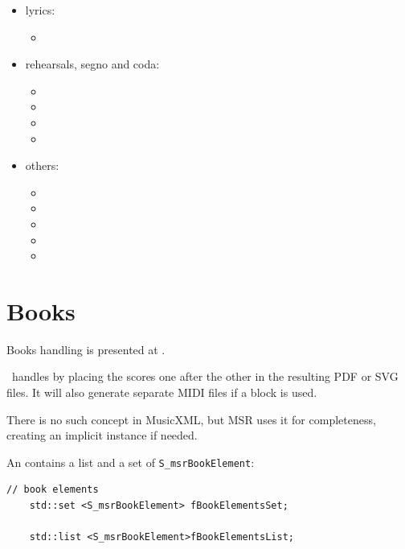 \begin{itemize}
\item lyrics:

\begin{itemize}
	\item {}
  \end{itemize}

\item rehearsals, segno and coda:

\begin{itemize}
  \item {}
	\item {}
  \item {}
  \item {}
 \end{itemize}

\item others:

\begin{itemize}
  \item {}
  \item {}
  \item {}
  \item {}
  \item {}
  \end{itemize}

\end{itemize}


\section{Books}\label{Books}

Books handling is presented at .

\lily\ handles  by placing the scores one after the other in the resulting PDF or SVG files. It will also generate separate MIDI files if a  block is used.

There is no such concept in MusicXML, but MSR uses it for completeness, creating an implicit  instance if needed.

An  contains a list and a set of {\tt S_msrBookElement}:
\begin{lstlisting}[language=CPlusPlus]
    // book elements
    std::set <S_msrBookElement> fBookElementsSet;

    std::list <S_msrBookElement>fBookElementsList;
\end{lstlisting}

